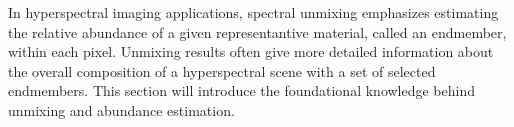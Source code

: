 In hyperspectral imaging applications, spectral unmixing emphasizes estimating the relative abundance of a given representantive material, called an endmember, within each pixel.  Unmixing results often give more detailed information about the overall composition of a hyperspectral scene with a set of selected endmembers. This section will introduce the foundational knowledge behind unmixing and abundance estimation. 

